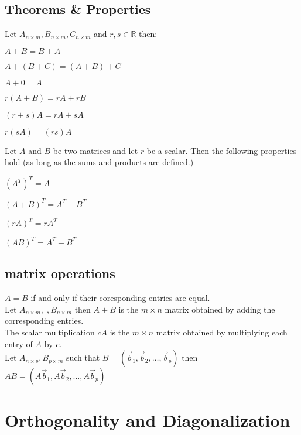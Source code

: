 \documentclass[5pt]{article}
\begin{document}
\begin{multicols}{2}
\subsection{Theorems \& Properties}
\begin{properties}
  Let $A_{n\times m},B_{n\times m},C_{n\times m}$ and $r,s\in\mathbb{R}$ then:
  \begin{itemize*}
    \item $A+B=B+A$
    \item $A+(B+C)=(A+B)+C$
    \item $A+0=A$
    \item $r(A+B)=rA+rB$
    \item $(r+s)A=rA+sA$
    \item $r(sA)=(rs)A$
  \end{itemize*}
\end{properties}


\begin{properties}
  Let $A$ and $B$ be two matrices and let $r$ be a scalar. Then the following properties hold (as long as the sums and products are defined.)
  \begin{itemize*}
    \item $(A^T)^T=A$
    \item $(A+B)^T=A^T+B^T$
    \item $(rA)^T=rA^T$
    \item $(AB)^T=A^T+B^T$
  \end{itemize*}
\end{properties}

\subsection{matrix operations}
$A=B$ if and only if their coresponding entries are equal.\\
Let $A_{n\times m},\;,B_{n\times m}$ then $A+B$ is the $m\times n$ matrix obtained by adding the corresponding entries.\\
The scalar multiplication $cA$ is  the $m\times n$ matrix obtained by multiplying each entry of $A$ by $c$.\\
Let $A_{n\times p}, B_{p\times m}$ such that $B=(\vec{b}_1, \vec{b}_2, \dots, \vec{b}_p)$ then $AB=(A\vec{b}_1, A\vec{b}_2, \dots, A\vec{b}_p)$


\section{Orthogonality and Diagonalization}

\end{multicols}
\end{document}
